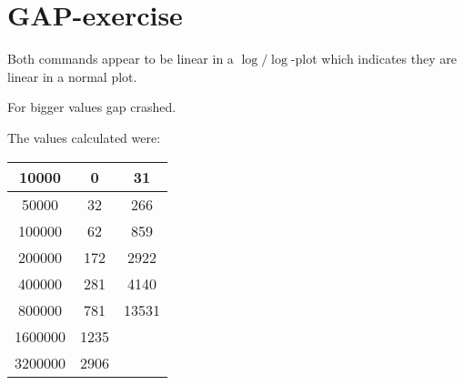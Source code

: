 \section{GAP-exercise}

Both commands appear to be linear in a $\log/\log$-plot which indicates they are linear in a normal plot.

For bigger values gap crashed.

The values calculated were:

\begin{tabular}{c|c|c}
10000	&0		&31\\\hline
50000	&32		&266\\\hline
100000	&62		&859\\\hline
200000	&172	&2922\\\hline
400000	&281	&4140\\\hline
800000	&781	&13531\\\hline
1600000	&1235	&\\\hline
3200000	&2906	&
\end{tabular}